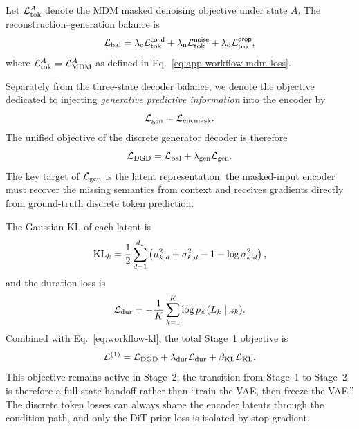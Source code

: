 Let $\mathcal{L}_{\mathrm{tok}}^{A}$ denote the MDM masked denoising objective under state $A$. The reconstruction--generation balance is
\begin{equation}
    \mathcal{L}_{\mathrm{bal}}
    =\lambda_{\mathrm c}\mathcal{L}_{\mathrm{tok}}^{\textsf{cond}}
    +\lambda_{\mathrm n}\mathcal{L}_{\mathrm{tok}}^{\textsf{noise}}
    +\lambda_{\mathrm d}\mathcal{L}_{\mathrm{tok}}^{\textsf{drop}},
    \label{eq:app-workflow-dg-unified}
\end{equation}
where $\mathcal{L}_{\mathrm{tok}}^A=\mathcal{L}_{\mathrm{MDM}}^A$ as defined in Eq.~\eqref{eq:app-workflow-mdm-loss}.

Separately from the three-state decoder balance, we denote the objective dedicated to injecting \emph{generative predictive information} into the encoder by
\begin{equation}
    \mathcal{L}_{\mathrm{gen}}=\mathcal{L}_{\mathrm{encmask}}.
    \label{eq:app-workflow-gen-variants}
\end{equation}
The unified objective of the discrete generator decoder is therefore
\begin{equation}
    \mathcal{L}_{\mathrm{DGD}}
    =\mathcal{L}_{\mathrm{bal}}
    +\lambda_{\mathrm{gen}}\mathcal{L}_{\mathrm{gen}}.
    \label{eq:app-workflow-dgd-total}
\end{equation}
The key target of $\mathcal{L}_{\mathrm{gen}}$ is the latent representation: the masked-input encoder must recover the missing semantics from context and receives gradients directly from ground-truth discrete token prediction.

The Gaussian KL of each latent is
\begin{equation}
    \operatorname{KL}_k
    =\frac12\sum_{d=1}^{d_z}
    \left(\mu_{k,d}^2+\sigma_{k,d}^2-1-\log\sigma_{k,d}^2\right),
    \label{eq:app-workflow-klk}
\end{equation}
and the duration loss is
\begin{equation}
    \mathcal{L}_{\mathrm{dur}}
    =-\frac1K\sum_{k=1}^{K}\log p_\psi(L_k\mid z_k).
    \label{eq:app-workflow-dur-loss}
\end{equation}
Combined with Eq.~\eqref{eq:workflow-kl}, the total Stage~1 objective is
\begin{equation}
    \mathcal{L}^{(1)}
    =\mathcal{L}_{\mathrm{DGD}}
    +\lambda_{\mathrm{dur}}\mathcal{L}_{\mathrm{dur}}
    +\beta_{\mathrm{KL}}\mathcal{L}_{\mathrm{KL}}.
    \label{eq:app-workflow-stage1-total}
\end{equation}
This objective remains active in Stage~2; the transition from Stage~1 to Stage~2 is therefore a full-state handoff rather than ``train the VAE, then freeze the VAE.'' The discrete token losses can always shape the encoder latents through the condition path, and only the DiT prior loss is isolated by stop-gradient.


